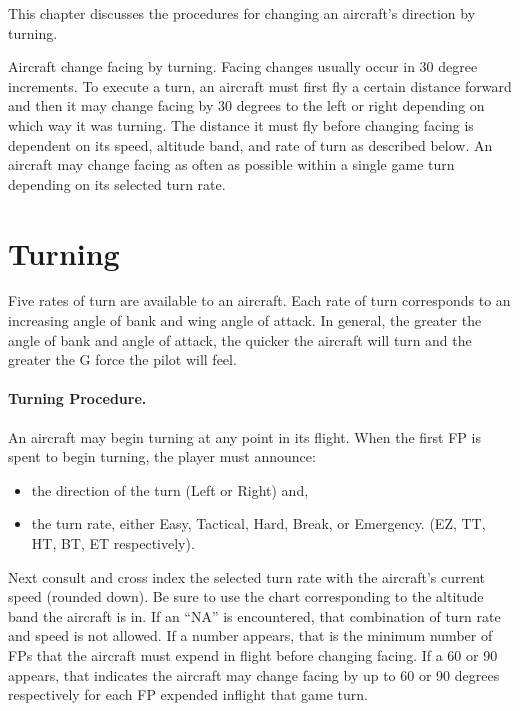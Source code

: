 
This chapter discusses the procedures for changing an aircraft's direction by turning.

Aircraft change facing by turning. Facing changes usually occur in 30 degree increments. To execute a turn, an aircraft must first fly a certain distance forward and then it may change facing by 30 degrees to the left or right depending on which way it was turning. The distance it must fly before changing facing is dependent on its speed, altitude band, and rate of turn as described below. An aircraft may change facing as often as possible within a single game turn depending on its selected turn rate.

\section{Turning}
\label{rule:turning}


Five rates of turn are available to an aircraft. Each rate of turn corresponds to an increasing angle of bank and wing angle of attack. In general, the greater the angle of bank and angle of attack, the quicker the aircraft will turn and the greater the G force the pilot will feel.

\paragraph{Turning Procedure.} An aircraft may begin turning at any point in its flight. When the first FP is spent to begin turning, the player must announce:

\begin{itemize}
    \item the direction of the turn (Left or Right) and,
    \item the turn rate, either Easy, Tactical, Hard, Break, or Emergency. (EZ, TT, HT, BT, ET respectively).
\end{itemize}

Next consult  and cross index the selected turn rate with the aircraft's current speed (rounded down). 
Be sure to use the chart corresponding to the altitude band the aircraft is in. If an “NA” is encountered, that combination of turn rate and speed is not allowed. If a number appears, that is the minimum number of FPs that the aircraft must expend in flight before changing facing. If a 60 or 90 appears, that indicates the aircraft may change facing by up to 60 or 90 degrees respectively for each FP expended inflight that game turn. 

